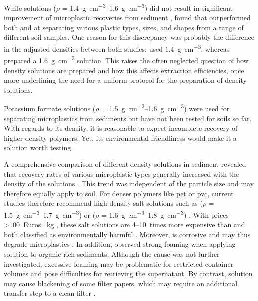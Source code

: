 While  solutions ($\rho$ = \SIrange{1.4}{1.6}{\gram\per\cubic\centi\meter}) did not result in significant improvement of microplastic recoveries from sediment \citep{QuinnValidation2017}, \citet{LiuMethod2019} found that  outperformed both  and  at separating various plastic types, sizes, and shapes from a range of different soil samples.
One reason for this discrepancy was probably the difference in the adjusted densities between both studies: \citet{QuinnValidation2017} used \SI{1.4}{\gram\per\cubic\centi\meter}, whereas \citet{LiuMethod2019} prepared a \SI{1.6}{\gram\per\cubic\centi\meter} solution. This raises the often neglected question of how density solutions are prepared and how this affects extraction efficiencies, once more underlining the need for a uniform protocol for the preparation of density solutions.

Potassium formate solutions ($\rho$ = \SIrange{1.5}{1.6}{\gram\per\cubic\centi\meter}) were used for separating microplastics from sediments \citep{StockSampling2019,XiongSources2018} but have not been tested for soils so far.
With regards to its density, it is reasonable to expect incomplete recovery of higher-density polymers. Yet, its environmental friendliness \citep{ECHAPotassium2020} would make it a solution worth testing.

A comprehensive comparison of different density solutions in sediment revealed that recovery rates of various microplastic types generally increased with the density of the solutions \citep{QuinnValidation2017}. This trend was independent of the particle size and may therefore equally apply to soil. For denser polymers like \ac{pet} or \ac{pvc}, current studies therefore recommend high-density salt solutions such as  ($\rho$ = \SIrange{1.5}{1.7}{\gram\per\cubic\centi\meter}) or  ($\rho$ = \SIrange{1.6}{1.8}{\gram\per\cubic\centi\meter}) \citep{MahonMicroplastics2017,HortonLarge2017,ZhangSimple2018}.
With prices \num{>100}~Euros \si{\per\kilo\gram} \citep{CampanalePractical2020}, these salt solutions are \numrange{4}{10}~times more expensive than  and both classified as environmentally harmful \citep{ECHASodium2020,ECHAZinc2020}. Moreover,  is corrosive and may thus degrade microplastics \citep{HeMicroplastics2018}. In addition, \citet{ZobkovEvaluation2017} observed strong foaming when applying  solution to organic-rich sediments. Although the cause was not further investigated, excessive foaming may be problematic for restricted container volumes and pose difficulties for retrieving the supernatant. By contrast,  solution may cause blackening of some filter papers, which may require an additional transfer step to a clean filter \citep{QuinnValidation2017}.

